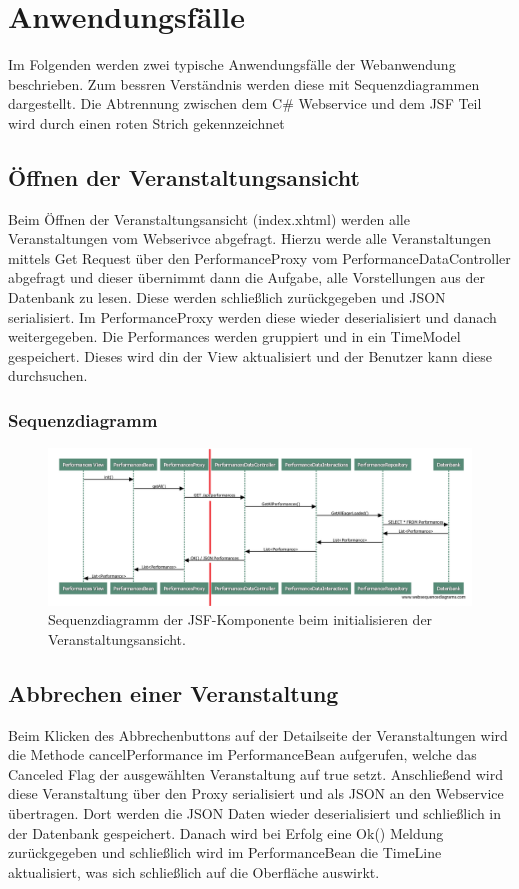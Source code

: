 \documentclass[a4paper,ngerman]{scrartcl}
\begin{document}
\newpage
\section{Anwendungsfälle}
Im Folgenden werden zwei typische Anwendungsfälle der Webanwendung beschrieben. Zum bessren Verständnis werden diese mit Sequenzdiagrammen dargestellt. Die Abtrennung zwischen dem C\# Webservice und dem JSF Teil wird durch einen roten Strich gekennzeichnet

\subsection{Öffnen der Veranstaltungsansicht}
Beim Öffnen der Veranstaltungsansicht (index.xhtml) werden alle Veranstaltungen vom Webserivce abgefragt. Hierzu werde alle Veranstaltungen mittels Get Request über den PerformanceProxy vom PerformanceDataController abgefragt und dieser übernimmt dann die Aufgabe, alle Vorstellungen aus der Datenbank zu lesen. Diese werden schließlich zurückgegeben und JSON serialisiert. Im PerformanceProxy werden diese wieder deserialisiert und danach weitergegeben. Die Performances werden gruppiert und in ein TimeModel gespeichert. Dieses wird din der View aktualisiert und der Benutzer kann diese durchsuchen.

\subsubsection{Sequenzdiagramm}
\begin{figure}[h]
\centering
\includegraphics[width=.85\textwidth]{sequence_diagrams/performances_all}
\caption{Sequenzdiagramm der JSF-Komponente beim initialisieren der Veranstaltungsansicht.}
\label{fig:beans}
\end{figure}

\newpage
\subsection{Abbrechen einer Veranstaltung}
Beim Klicken des Abbrechenbuttons auf der Detailseite der Veranstaltungen wird die Methode cancelPerformance im PerformanceBean aufgerufen, welche das Canceled Flag der ausgewählten Veranstaltung auf true setzt. Anschließend wird diese Veranstaltung über den Proxy serialisiert und als JSON an den Webservice übertragen. Dort werden die JSON Daten wieder deserialisiert und schließlich in der Datenbank gespeichert. Danach wird bei Erfolg eine Ok() Meldung zurückgegeben und schließlich wird im PerformanceBean die TimeLine aktualisiert, was sich schließlich auf die Oberfläche auswirkt. 
\end{document}
